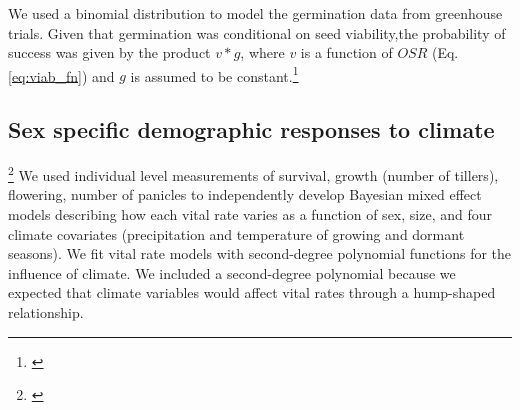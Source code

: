 \documentclass[12pt]{article}\usepackage[]{graphicx}\usepackage[dvipsnames]{xcolor}
\newcommand{\tom}[2]{{\color{red}{#1}}\footnote{\textit{\color{red}{#2}}}}
\begin{document}
We used a binomial distribution to model the germination data from greenhouse trials.
Given that germination was conditional on seed viability,the probability of success was given by the product $v*g$, where $v$ is a function of $OSR$ (Eq. \ref{eq:viab_fn}) and $g$ is assumed to be constant.\tom{}{You provide no information about how this model was fit. This echoes my previous comment that the data analysis should be better organized.}

\subsection*{Sex specific demographic responses to climate}
\tom{}{This section needs to be more carefully edited, which I have not done. There is redundancy between the two paragraphs and most importantly, there is not enough biological rationale for the model that you fit. You do not describe which interactions you include, which you do not include, and why. This is a very complex model -- 24 fixed-effect coefficients! -- and it will get skepticism from reviewers. You need to justify why this is the right model, especially since you do not have any model selection or variable selection.}
We used individual level measurements of survival, growth (number of tillers), flowering, number of panicles to independently develop Bayesian mixed effect models describing how each vital rate varies as a function of sex, size, and four climate covariates (precipitation and temperature of growing and dormant seasons). 
We fit vital rate models with second-degree polynomial functions for the influence of climate.
We included a second-degree polynomial because we expected that climate variables would affect vital rates through a hump-shaped relationship. 
\end{document}
